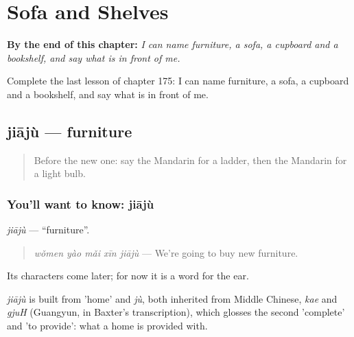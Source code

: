 
\chapter{Sofa and Shelves}
\label{ch:zh-sofa-and-shelves}

\begin{chapteropening}
\textbf{By the end of this chapter:} \emph{I can name furniture, a sofa, a cupboard and a bookshelf, and say what is in front of me.}

Complete the last lesson of chapter 175: I can name furniture, a sofa, a cupboard and a bookshelf, and say what is in front of me.
\end{chapteropening}

\section[jiājù]{jiājù — furniture}

\label{lesson:ZH-C175-jiaju}



\begin{quote}
Before the new one: say the Mandarin for a ladder, then the Mandarin for a light bulb.
\end{quote}

\subsection*{You'll want to know: jiājù}
\emph{jiājù} — \textquotedblleft{}furniture\textquotedblright{}.

\begin{quote}
\emph{wǒmen yào mǎi xīn jiājù} — We're going to buy new furniture.
\end{quote}

Its characters come later; for now it is a word for the ear.

\begin{cousinweb}
\emph{jiājù} is built from  'home' and \emph{jù}, both inherited from Middle Chinese, \emph{kae} and \emph{gjuH} (Guangyun, in Baxter's transcription), which glosses the second 'complete' and 'to provide': what a home is provided with.
\end{cousinweb}

